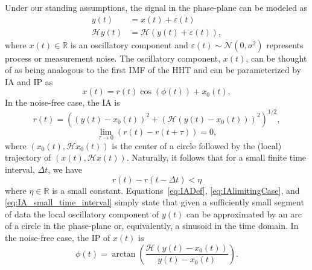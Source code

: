\documentclass[journal,11pt,a4paper,onecolumn,draftcls]{IEEEtran}
\begin{document}
Under our standing assumptions, the signal in the phase-plane can be modeled as
\begin{align}\label{eq:SignalModel}
y\left( t \right) &= x\left( t \right) + \varepsilon \left( t \right) \\
\mathcal{H}y\left( t \right) &= \mathcal{H}(y\left( t \right) + \varepsilon \left( t \right)),
\end{align}
where $x(t) \in \mathbb{R}$ is an oscillatory component and $\varepsilon(t) \sim \mathcal{N}(0,\sigma^2)$ represents process or measurement noise. The oscillatory component, $x(t)$, can be thought of as being analogous to the first IMF of the HHT and can be parameterized by IA and IP as
\begin{equation}\label{eq:InstAmplitudeAndPhase}
    x\left( t \right) = r\left( t \right)\cos \left( {\phi \left( t \right)} \right) + x_0(t),
\end{equation}
In the noise-free case, the IA is
\begin{equation}\label{eq:IADef}
    r\left( t \right) = \left( \left( y\left( t \right) - x_0\left( t \right) \right)^2 + \left( \mathcal{H}\left( y\left( t \right) - x_0\left( t \right) \right) \right)^2\right)^{1/2},
\end{equation}
\begin{equation}\label{eq:IAlimitingCase}
\mathop {\lim }\limits_{\tau  \to 0} \left( r\left( t \right) - r\left( t + \tau \right) \right) = 0,
\end{equation}
where $\left(x_0(t), \mathcal{H}x_0(t)\right)$ is the center of a circle followed by the (local) trajectory of $\left(x(t), \mathcal{H}x(t)\right)$. Naturally, it follows that for a small finite time interval, $\Delta t$, we have
\begin{equation}\label{eq:IA_small_time_interval}
    r(t)-r(t-\Delta t) < \eta
\end{equation}
where $\eta \in \mathbb{R}$ is a small constant. Equations~\ref{eq:IADef}, \ref{eq:IAlimitingCase}, and \ref{eq:IA_small_time_interval} simply state that given a sufficiently small segment of data the local oscillatory component of $y(t)$ can be approximated by an arc of a circle in the phase-plane or, equivalently, a sinusoid in the time domain. In the noise-free case, the IP of $x(t)$ is
\begin{equation}\label{IPdef}
    \phi \left( t \right) = \arctan \left( \frac{\mathcal{H}\left( y\left( t \right) - x_0\left( t \right) \right)}
    {y\left( t \right) - x_0\left( t \right)} \right).
\end{equation}
\end{document}
